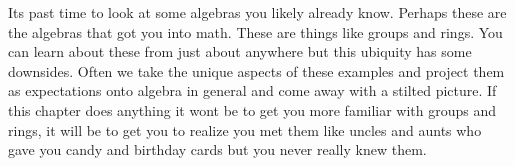 
Its past time to look at some algebras you likely already know.
Perhaps these are the algebras that got you into math.  These 
are things like groups and rings.  You can learn about these from 
just about anywhere but this ubiquity has some downsides.  
Often we take the unique aspects of these examples and project 
them as expectations onto algebra in general and come away with 
a stilted picture.  If this chapter does anything it wont be to 
get you more familiar with groups and rings, it will be to get you 
to realize you met them like uncles and aunts who gave you 
candy and birthday cards but you never really knew them.